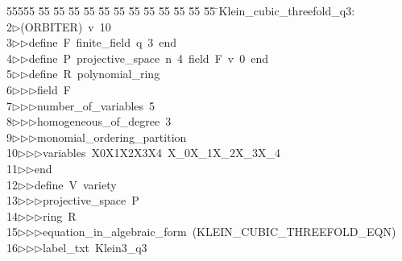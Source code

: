 %
%
\begin{tabbing}
55555 \= 55 \= 55 \= 55 \= 55 \= 55 \= 55 \= 55 \= 55 \= 55 \= 55 \= 55 \= 55 \= \>Klein\_cubic\_threefold\_q3:\\[0pt]
2\>$\triangleright$\>(ORBITER)\ v\ 10\ \\[0pt]
3\>$\triangleright$\>$\triangleright$\>define\ F\ finite\_field\ q\ 3\ end\ \\[0pt]
4\>$\triangleright$\>$\triangleright$\>define\ P\ projective\_space\ n\ 4\ field\ F\ v\ 0\ end\ \\[0pt]
5\>$\triangleright$\>$\triangleright$\>define\ R\ polynomial\_ring\ \\[0pt]
6\>$\triangleright$\>$\triangleright$\>$\triangleright$\>field\ F\ \\[0pt]
7\>$\triangleright$\>$\triangleright$\>$\triangleright$\>number\_of\_variables\ 5\ \\[0pt]
8\>$\triangleright$\>$\triangleright$\>$\triangleright$\>homogeneous\_of\_degree\ 3\ \\[0pt]
9\>$\triangleright$\>$\triangleright$\>$\triangleright$\>monomial\_ordering\_partition\ \\[0pt]
10\>$\triangleright$\>$\triangleright$\>$\triangleright$\>variables\ X0X1X2X3X4\ X\_0X\_1X\_2X\_3X\_4\ \\[0pt]
11\>$\triangleright$\>$\triangleright$\>end\ \\[0pt]
12\>$\triangleright$\>$\triangleright$\>define\ V\ variety\ \\[0pt]
13\>$\triangleright$\>$\triangleright$\>$\triangleright$\>projective\_space\ P\ \\[0pt]
14\>$\triangleright$\>$\triangleright$\>$\triangleright$\>ring\ R\ \\[0pt]
15\>$\triangleright$\>$\triangleright$\>$\triangleright$\>equation\_in\_algebraic\_form\ (KLEIN\_CUBIC\_THREEFOLD\_EQN)\ \\[0pt]
16\>$\triangleright$\>$\triangleright$\>$\triangleright$\>label\_txt\ Klein3\_q3\ \\[0pt]

\end{tabbing}
